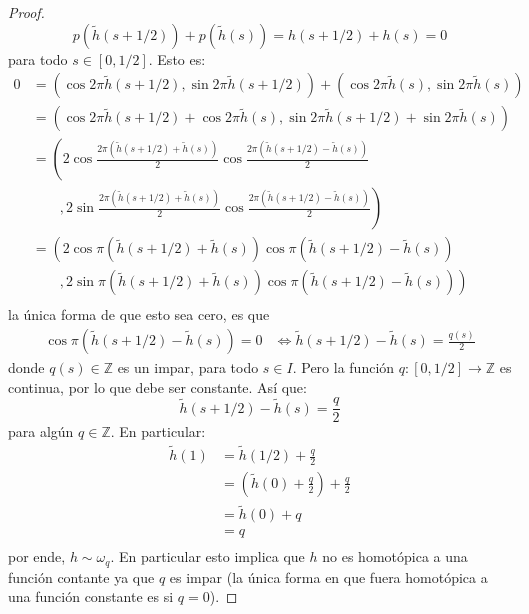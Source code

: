 \documentclass[12pt]{report}
\theoremstyle{largebreak}
\newcommand\cf[3]{\ensuremath{#1:#2\rightarrow#3}}
\begin{document}
\begin{proof}
        \begin{equation*}
            p(\widetilde{h}(s+1/2))+p(\widetilde{h}(s))=h(s+1/2)+h(s)=0
        \end{equation*}
        para todo $s\in[0,1/2]$. Esto es:
        \begin{equation*}
            \begin{split}
                0&=(\cos 2\pi \widetilde{h}(s+1/2),\sin 2\pi \widetilde{h}(s+1/2))+(\cos 2\pi \widetilde{h}(s),\sin 2\pi \widetilde{h}(s))\\
                &=(\cos 2\pi \widetilde{h}(s+1/2)+\cos 2\pi \widetilde{h}(s),\sin 2\pi \widetilde{h}(s+1/2)+\sin 2\pi \widetilde{h}(s))\\
                &=\left(2\cos\frac{2\pi(\widetilde{h}(s+1/2)+\widetilde{h}(s))}{2}\cos\frac{2\pi(\widetilde{h}(s+1/2)-\widetilde{h}(s))}{2}\right.\\
                &\quad\quad,\left.2\sin\frac{2\pi(\widetilde{h}(s+1/2)+\widetilde{h}(s))}{2}\cos\frac{2\pi(\widetilde{h}(s+1/2)-\widetilde{h}(s))}{2}\right)\\
                &=\left(2\cos\pi(\widetilde{h}(s+1/2)+\widetilde{h}(s))\cos\pi(\widetilde{h}(s+1/2)-\widetilde{h}(s))\right.\\
                &\quad\quad,\left.2\sin\pi(\widetilde{h}(s+1/2)+\widetilde{h}(s))\cos\pi(\widetilde{h}(s+1/2)-\widetilde{h}(s))\right)\\
            \end{split}
        \end{equation*}
        la única forma de que esto sea cero, es que
        \begin{equation*}
            \begin{split}
                \cos\pi(\widetilde{h}(s+1/2)-\widetilde{h}(s))=0&\iff \widetilde{h}(s+1/2)-\widetilde{h}(s)=\frac{q(s)}{2}
            \end{split}
        \end{equation*}
        donde $q(s)\in\mathbb{Z}$ es un impar, para todo $s\in I$. Pero la función $\cf{q}{[0,1/2]}{\mathbb{Z}}$ es continua, por lo que debe ser constante. Así que:
        \begin{equation*}
            \widetilde{h}(s+1/2)-\widetilde{h}(s)=\frac{q}{2}
        \end{equation*}
        para algún $q\in\mathbb{Z}$. En particular:
        \begin{equation*}
            \begin{split}
                \widetilde{h}(1)&=\widetilde{h}(1/2)+\frac{q}{2}\\
                &=\left(\widetilde{h}(0)+\frac{q}{2}\right)+\frac{q}{2}\\
                &=\widetilde{h}(0)+q\\
                &=q\\
            \end{split}
        \end{equation*}
        por ende, $h\sim\omega_q$. En particular esto implica que $h$ no es homotópica a una función contante ya que $q$ es impar (la única forma en que fuera homotópica a una función constante es si $q=0$).


\end{proof}
\end{document}
